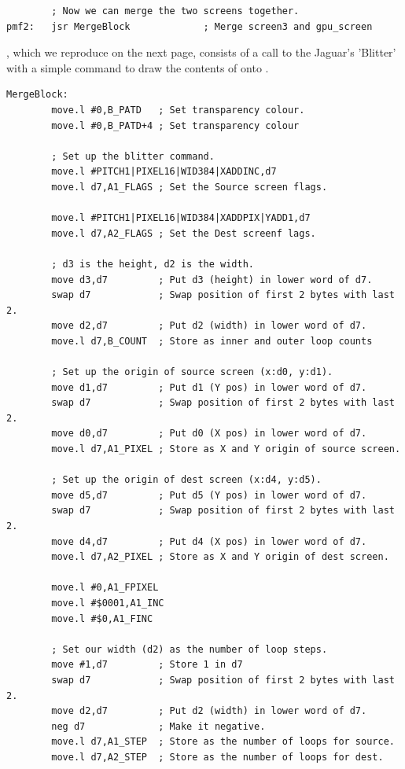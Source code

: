 \begin{lstlisting}
        ; Now we can merge the two screens together. 
pmf2:   jsr MergeBlock             ; Merge screen3 and gpu_screen
\end{lstlisting}

, which we reproduce on the next page, consists of a call to the Jaguar's
'Blitter' with a simple command to draw the contents of  onto .
\clearpage
\begin{lstlisting}
MergeBlock:
        move.l #0,B_PATD   ; Set transparency colour.
        move.l #0,B_PATD+4 ; Set transparency colour
    
        ; Set up the blitter command.
        move.l #PITCH1|PIXEL16|WID384|XADDINC,d7
        move.l d7,A1_FLAGS ; Set the Source screen flags.
    
        move.l #PITCH1|PIXEL16|WID384|XADDPIX|YADD1,d7
        move.l d7,A2_FLAGS ; Set the Dest screenf lags.
    
        ; d3 is the height, d2 is the width.
        move d3,d7         ; Put d3 (height) in lower word of d7.
        swap d7            ; Swap position of first 2 bytes with last 2.
        move d2,d7         ; Put d2 (width) in lower word of d7.
        move.l d7,B_COUNT  ; Store as inner and outer loop counts
    
        ; Set up the origin of source screen (x:d0, y:d1). 
        move d1,d7         ; Put d1 (Y pos) in lower word of d7.
        swap d7            ; Swap position of first 2 bytes with last 2.
        move d0,d7         ; Put d0 (X pos) in lower word of d7.
        move.l d7,A1_PIXEL ; Store as X and Y origin of source screen.
    
        ; Set up the origin of dest screen (x:d4, y:d5). 
        move d5,d7         ; Put d5 (Y pos) in lower word of d7.
        swap d7            ; Swap position of first 2 bytes with last 2.
        move d4,d7         ; Put d4 (X pos) in lower word of d7.
        move.l d7,A2_PIXEL ; Store as X and Y origin of dest screen.
    
        move.l #0,A1_FPIXEL
        move.l #$0001,A1_INC
        move.l #$0,A1_FINC
    
        ; Set our width (d2) as the number of loop steps.
        move #1,d7         ; Store 1 in d7
        swap d7            ; Swap position of first 2 bytes with last 2.
        move d2,d7         ; Put d2 (width) in lower word of d7.
        neg d7             ; Make it negative.
        move.l d7,A1_STEP  ; Store as the number of loops for source.
        move.l d7,A2_STEP  ; Store as the number of loops for dest.
    

\end{lstlisting}
